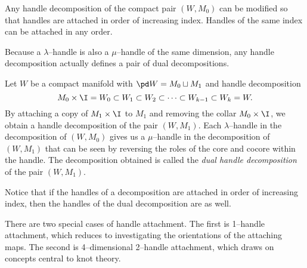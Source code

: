 \begin{prop}
	\label{prop:incrindex}
	Any handle decomposition of the compact pair $(W,M_0)$ can be modified so that handles are attached in order of increasing index.
	Handles of the same index can be attached in any order.	
\end{prop}

Because a $\lambda$--handle is also a $\mu$--handle of the same dimension, any handle decomposition actually defines a pair of dual decompositions.

\begin{defn}
	Let $W$ be a compact manifold with $\pd W = M_0 \sqcup M_1$ and handle decomposition
	\[
	M_0\times\I = W_0 \subset W_1 \subset W_2 \subset \cdots \subset W_{k-1} \subset W_k = W.
	\]
	By attaching a copy of $M_1 \times\I$ to $M_1$ and removing the collar $M_0\times\I$, we obtain a handle decomposition of the pair $(W,M_1)$.
	Each $\lambda$--handle in the decomposition of $(W,M_0)$ gives us a $\mu$--handle in the decomposition of $(W,M_1)$ that can be seen by reversing the roles of the core and cocore within the handle.
	The decomposition obtained is called the \emph{dual handle decomposition} of the pair $(W,M_1)$.
\end{defn}

Notice that if the handles of a decomposition are attached in order of increasing index, then the handles of the dual decomposition are as well.

There are two special cases of handle attachment.
The first is 1--handle attachment, which reduces to investigating the orientations of the attaching maps.
The second is 4--dimensional 2--handle attachment, which draws on concepts central to knot theory.

